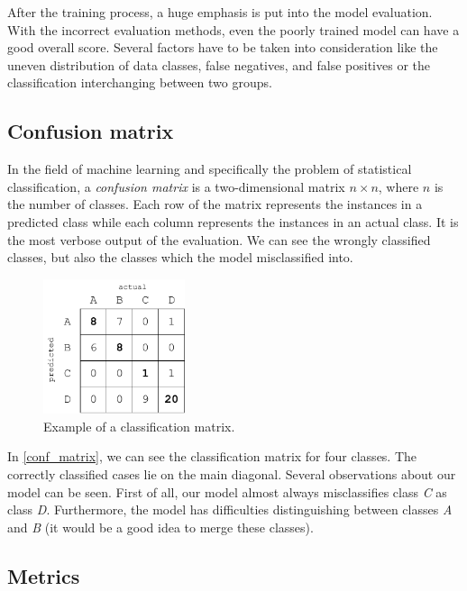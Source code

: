 After the training process, a huge emphasis is put into the model evaluation. With the incorrect evaluation methods, even the poorly trained model can have a good overall score. Several factors have to be taken into consideration like the uneven distribution of data classes, false negatives, and false positives or the classification interchanging between two groups.

\subsection{Confusion matrix}

In the field of machine learning and specifically the problem of statistical classification, a \textit{confusion matrix} \cite{conf_matrix} is a two-dimensional matrix $n \times n$, where $n$ is the number of classes. Each row of the matrix represents the instances in a predicted class while each column represents the instances in an actual class. It is the most verbose output of the evaluation. We can see the wrongly classified classes, but also the classes which the model misclassified into. 

\begin{figure}[h]
\centering
\includegraphics[width=0.37\textwidth]{tex/images/conf_matrix}
\caption{Example of a classification matrix.}
\label{conf_matrix}
\end{figure}

\noindent
In \autoref{conf_matrix}, we can see the classification matrix for four classes. The correctly classified cases lie on the main diagonal. Several observations about our model can be seen. First of all, our model almost always misclassifies class \textit{C} as class \textit{D}. Furthermore, the model has difficulties distinguishing between classes \textit{A} and \textit{B} (it would be a good idea to merge these classes).

\subsection{Metrics}

